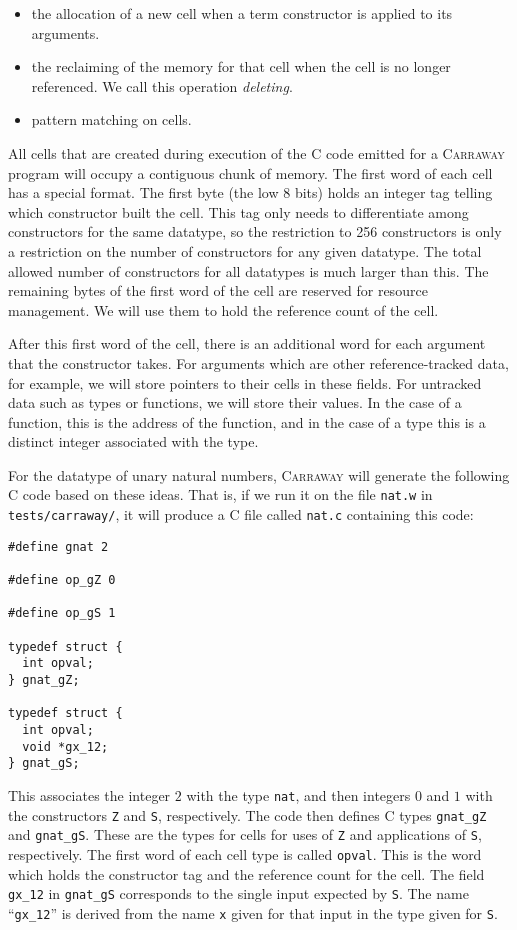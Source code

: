 \documentclass{book}[12pt]
\newcommand{\carraway}[0]{\textsc{Carraway}\xspace}
\begin{document}
\begin{itemize}
\item the allocation of a new cell when a term constructor is applied to its arguments.
\item the reclaiming of the memory for that cell when the cell is no
longer referenced.  We call this operation \emph{deleting}.
\item pattern matching on cells.
\end{itemize}

\noindent All cells that are created during execution of the C code
emitted for a \carraway program will occupy a contiguous chunk of
memory.  The first word of each cell has a special format.  The first
byte (the low 8 bits) holds an integer tag telling which constructor
built the cell.  This tag only needs to differentiate among
constructors for the same datatype, so the restriction to 256
constructors is only a restriction on the number of constructors for
any given datatype.  The total allowed number of constructors for all
datatypes is much larger than this.  The remaining bytes of the first
word of the cell are reserved for resource management.  We will use
them to hold the reference count of the cell.

After this first word of the cell, there is an additional word for
each argument that the constructor takes.  For arguments which are
other reference-tracked data, for example, we will store pointers to
their cells in these fields.  For untracked data such as types or
functions, we will store their values.  In the case of a function,
this is the address of the function, and in the case of a type this is
a distinct integer associated with the type.

For the datatype of unary natural numbers, \carraway will generate
the following C code based on these ideas.  That is, if we run it on
the file \texttt{nat.w} in \texttt{tests/carraway/}, it will produce
a C file called \texttt{nat.c} containing this code:

\begin{verbatim}
#define gnat 2

#define op_gZ 0

#define op_gS 1

typedef struct {
  int opval;
} gnat_gZ;

typedef struct {
  int opval;
  void *gx_12;
} gnat_gS;
\end{verbatim}

\noindent This associates the integer $2$ with the type \texttt{nat},
and then integers $0$ and $1$ with the constructors \texttt{Z} and
\texttt{S}, respectively.  The code then defines C types
\texttt{gnat\_gZ} and \texttt{gnat\_gS}.  These are the types for
cells for uses of \texttt{Z} and applications of \texttt{S},
respectively.  The first word of each cell type is called
\texttt{opval}.  This is the word which holds the constructor tag and
the reference count for the cell.  The field \texttt{gx\_12} in
\texttt{gnat\_gS} corresponds to the single input expected by
\texttt{S}.  The name ``\texttt{gx\_12}'' is derived from the name
\texttt{x} given for that input in the type given for \texttt{S}.
\end{document}
